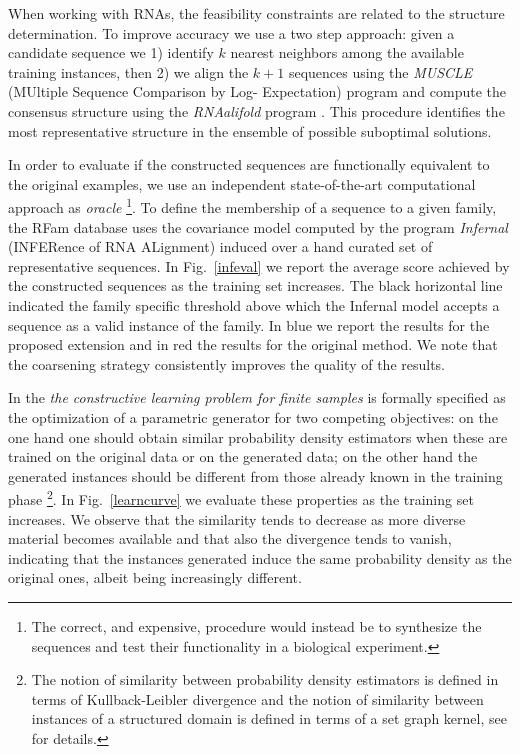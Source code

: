 \documentclass{article}
\begin{document}
When working with RNAs, the feasibility constraints are related to the
structure determination. To improve accuracy we use a two step approach:
given a candidate sequence we 1) identify $k$ nearest neighbors among the
available training instances, then 2) we align the $k+1$ sequences using the
\emph{MUSCLE} (MUltiple Sequence Comparison by Log- Expectation) program
\citep{muscle} and compute the consensus structure using the \emph{RNAalifold}
program \citep{rnaalifold}. This procedure identifies
the most representative structure in the ensemble of possible suboptimal
solutions.

In order to evaluate if the constructed sequences are functionally equivalent
to the original examples, we use an independent state-of-the-art computational
approach as {\em oracle} \footnote{The correct, and expensive, procedure would
instead be to synthesize the sequences and test their functionality in a
biological experiment.}. To define the membership of a sequence to a given
family, the RFam database uses the covariance model computed by the program
\emph{Infernal} (INFERence of RNA ALignment) \citep{infernal} induced over a
hand curated set of representative sequences.
In Fig.~\ref{infeval} we report the average score achieved by the constructed
sequences as the training set increases. The black horizontal line indicated
the family specific threshold above which the Infernal model accepts a
sequence as a valid instance of the family. In blue we report the results for
the proposed extension and in red the results for the original method. We note
that the coarsening strategy consistently improves the quality of the results.

In \cite{costa16} the \emph{the constructive learning problem for finite
samples} is formally specified as the optimization of a parametric generator
for two competing objectives: on the one hand one should obtain similar
probability density estimators when these are trained on the original data or
on the generated data; on the other hand the generated instances should be
different from those already known in the training phase \footnote{The notion
of similarity between probability density estimators is defined in terms of
Kullback-Leibler divergence and the notion of similarity between instances of
a structured domain is defined in terms of a set graph kernel, see
\citep{costa16} for details.}. In Fig.~\ref{learncurve} we evaluate these
properties as the training set increases. We observe that the similarity tends
to decrease as more diverse material becomes available and that also the
divergence tends to vanish, indicating that the instances generated induce the
same probability density as the original ones, albeit being increasingly
different.
\end{document}
